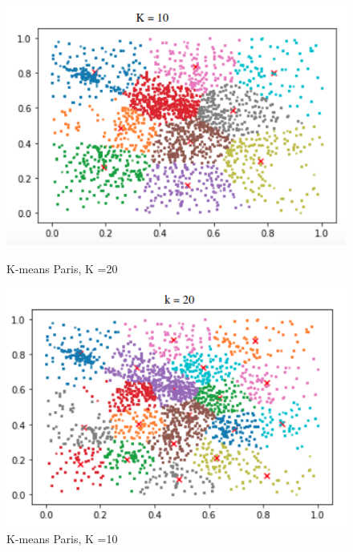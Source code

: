 \documentclass{report}
\begin{document}
  \begin{figure}[H]
    \begin{minipage}{0.4\textwidth}
      \centering
      \includegraphics[scale=0.40]{images/k-means_paris10.png}
      \caption{K-means Paris, K =20}\label{Fig:Data1}
    \end{minipage}\hfill
    \begin{minipage}{0.4\textwidth}
      \centering
      \includegraphics[scale=0.40]{images/k-means_paris20.png}
      \caption{K-means Paris, K =10}\label{Fig:Data2}
    \end{minipage}
  \end{figure}
\end{document}
